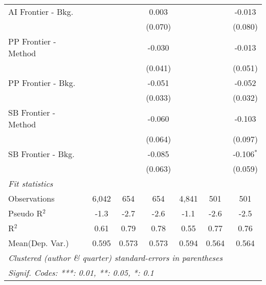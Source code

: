 \begin{tabular}{lcccccc}
   AI Frontier - Bkg.   &              &               & 0.003       &              &               & -0.013\\   
                        &              &               & (0.070)     &              &               & (0.080)\\   
   PP Frontier - Method &              &               & -0.030      &              &               & -0.013\\   
                        &              &               & (0.041)     &              &               & (0.051)\\   
   PP Frontier - Bkg.   &              &               & -0.051      &              &               & -0.052\\   
                        &              &               & (0.033)     &              &               & (0.032)\\   
   SB Frontier - Method &              &               & -0.060      &              &               & -0.103\\   
                        &              &               & (0.064)     &              &               & (0.097)\\   
   SB Frontier - Bkg.   &              &               & -0.085      &              &               & -0.106$^{*}$\\   
                        &              &               & (0.063)     &              &               & (0.059)\\   
   \midrule
   \emph{Fit statistics}\\
   Observations         & 6,042        & 654           & 654         & 4,841        & 501           & 501\\  
   Pseudo R$^2$         & -1.3         & -2.7          & -2.6        & -1.1         & -2.6          & -2.5\\  
   R$^2$                & 0.61         & 0.79          & 0.78        & 0.55         & 0.77          & 0.76\\  
Mean(Dep. Var.) & 0.595 & 0.573 & 0.573 & 0.594 & 0.564 & 0.564 \\
   \midrule \midrule
   \multicolumn{7}{l}{\emph{Clustered (author \& quarter) standard-errors in parentheses}}\\
   \multicolumn{7}{l}{\emph{Signif. Codes: ***: 0.01, **: 0.05, *: 0.1}}\\
\end{tabular}
\par\endgroup
